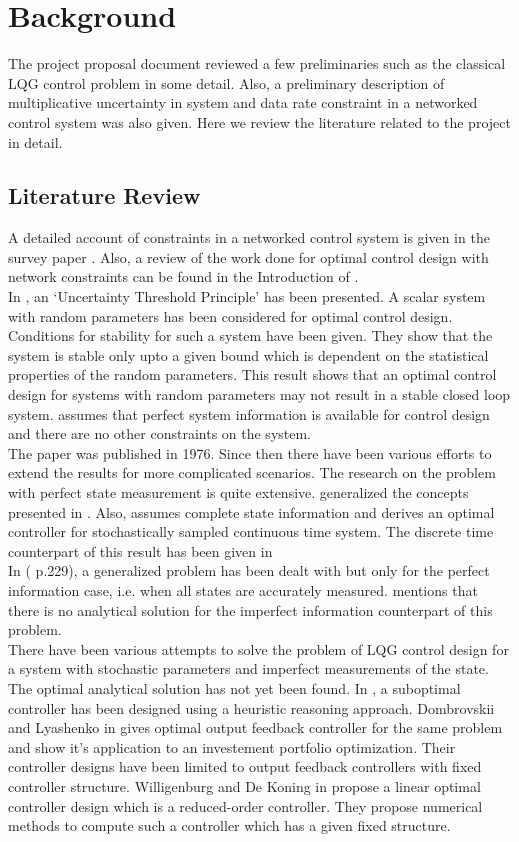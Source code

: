 \documentclass[12pt]{caltech_thesis_progress1}
\begin{document}
\chapter{Background}
The project proposal document reviewed a few preliminaries such as the classical LQG control problem in some detail. Also, a preliminary description of multiplicative uncertainty in system and data rate constraint in a networked control system was also given. Here we review the literature related to the project in detail.
	\section{Literature Review}
		A detailed account of constraints in a networked control system is given in the survey paper \cite{constraints}. Also, a review of the work done for optimal control design with network constraints can be found in the Introduction of \cite{gireeja}. \\
	In \cite{utp}, an `Uncertainty Threshold Principle' has been presented. A scalar system with random parameters has been considered for optimal control design. Conditions for stability for such a system have been given. They show that the system is stable only upto a given bound which is dependent on the statistical properties of the random parameters. This result shows that an optimal control design for systems with random parameters may not result in a stable closed loop system. \cite{utp} assumes that perfect system information is available for control design and there are no other constraints on the system. \\
	The paper \cite{utp} was published in 1976. Since then there have been various efforts to extend the results for more complicated scenarios. The research on the problem with perfect state measurement is quite extensive. \cite{deko82} generalized the concepts presented in \cite{utp}. Also, \cite{deko88} assumes complete state information and derives an optimal controller for stochastically sampled continuous time system. The discrete time counterpart of this result has been given in \cite{yaz}\\ In (\cite{berstekas} p.229), a generalized problem has been dealt with but only for the perfect information case, i.e. when all states are accurately measured. \cite{berstekas} mentions that there is no analytical solution for the imperfect information counterpart of this problem. \\
	There have been various attempts to solve the problem of LQG control design for a system with stochastic parameters and imperfect measurements of the state. The optimal analytical solution has not yet been found. In \cite{samir}, a suboptimal controller has been designed using a heuristic reasoning approach. Dombrovskii and Lyashenko in \cite{russian} gives optimal output feedback controller for the same problem and show it's application to an investement portfolio optimization. Their controller designs have been limited to output feedback controllers with fixed controller structure. Willigenburg and De Koning in \cite{deko} propose a linear optimal controller design which is a reduced-order controller. They propose numerical methods to compute such a controller which has a given fixed structure. \\
\end{document}
